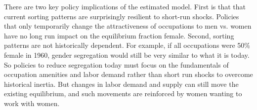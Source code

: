 \documentclass[11pt]{article}
\begin{document}







There are two key policy implications of the estimated model. First is that that current sorting patterns are surprisingly resilient to short-run shocks. Policies that only temporarily change the attractiveness of occupations to men vs. women have no long run impact on the equilibrium fraction female. Second, sorting patterns are not historically dependent. For example, if all occupations were 50\% female in 1960, gender segregation would still be very similar to what it is today. So policies to reduce segregation today must focus on the fundamentals of occupation amenities and labor demand rather than short run shocks to overcome historical inertia. But changes in labor demand and supply can still move the existing equilibrium, and such movements are reinforced by women wanting to work with women.

 
\end{document}

